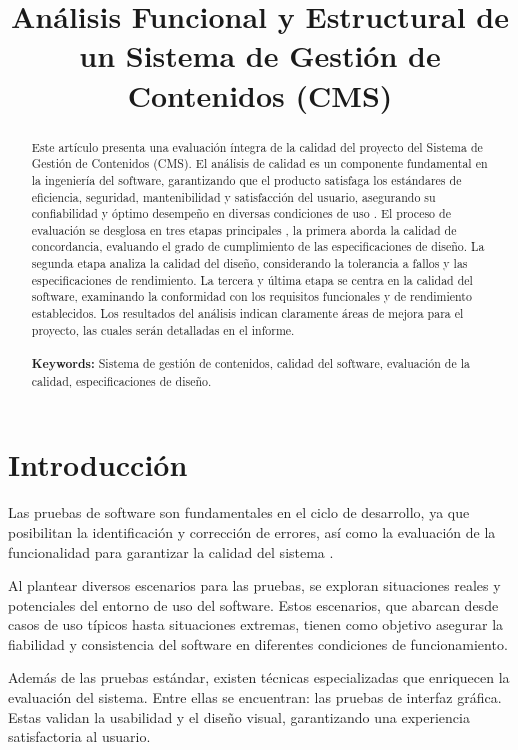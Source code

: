 \documentclass[10pt,times,twocolumn]{article}
\title{Análisis Funcional y Estructural de un Sistema de Gestión de Contenidos (CMS)}
\author
{
	\anonymize{Marco Acosta}\inst{1} 	
	\and
	\anonymize{Nilda Gómez}\inst{1}
	\and
	\anonymize{Nathaly Prieto}\inst{1}
	\and
	\anonymize{Elías Cristaldo}\inst{1}
}
\begin{document}
\maketitle

\begin{abstract}
Este artículo presenta una evaluación íntegra de la calidad del proyecto del Sistema de Gestión de Contenidos (CMS). El análisis de calidad es un componente fundamental en la ingeniería del software, garantizando que el producto satisfaga los estándares de eficiencia, seguridad, mantenibilidad y satisfacción del usuario, asegurando su confiabilidad y óptimo desempeño en diversas condiciones de uso \cite{swebok}. El proceso de evaluación se desglosa en tres etapas principales \cite{pressman}, la primera aborda la calidad de concordancia, evaluando el grado de cumplimiento de las especificaciones de diseño. La segunda etapa analiza la calidad del diseño, considerando la tolerancia a fallos y las especificaciones de rendimiento. La tercera y última etapa se centra en la calidad del software, examinando la conformidad con los requisitos funcionales y de rendimiento establecidos. Los resultados del análisis indican claramente áreas de mejora para el proyecto, las cuales serán detalladas en el informe.\\ \\
{\bf Keywords:} Sistema de gestión de contenidos, calidad del software, evaluación de la calidad, especificaciones de diseño.\\
\end{abstract}

\section{Introducción}
Las pruebas de software son fundamentales en el ciclo de desarrollo, ya que posibilitan la identificación y corrección de errores, así como la evaluación de la funcionalidad para garantizar la calidad del sistema \cite{pressman}.

Al plantear diversos escenarios para las pruebas, se exploran situaciones reales y potenciales del entorno de uso del software. Estos escenarios, que abarcan desde casos de uso típicos hasta situaciones extremas, tienen como objetivo asegurar la fiabilidad y consistencia del software en diferentes condiciones de funcionamiento.

Además de las pruebas estándar, existen técnicas especializadas que enriquecen la evaluación del sistema. Entre ellas se encuentran: las pruebas de interfaz gráfica. Estas validan la usabilidad y el diseño visual, garantizando una experiencia satisfactoria al usuario.
\end{document}
